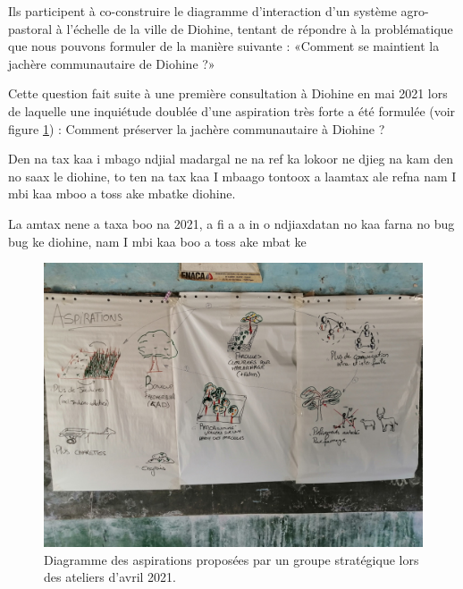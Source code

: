 \begin{paracol}{2}
  Ils participent à co-construire le diagramme d'interaction d'un système agro-pastoral à l'échelle de la ville de Diohine, tentant de répondre à la problématique que nous pouvons formuler de la manière suivante : «Comment se maintient la jachère communautaire de Diohine ?»

  Cette question fait suite à une première consultation à Diohine en mai 2021 lors de laquelle une inquiétude doublée d'une aspiration très forte a été formulée (voir figure \ref{aspiration}) : Comment préserver la jachère communautaire à Diohine ?\cite{perrotton_definition_2021}

  \switchcolumn %

  Den na tax kaa i mbago ndjial madargal ne na ref ka lokoor ne djieg na kam den no saax le diohine, to ten na tax kaa I mbaago tontoox a laamtax ale refna nam I mbi kaa mboo a toss ake mbatke diohine.

  La amtax nene a taxa boo na 2021, a fi a a in o ndjiaxdatan no kaa farna no bug bug ke diohine, nam I mbi kaa boo a toss ake mbat ke

\end{paracol}

\begin{figure}[h!]
  \begin{center}
  \includegraphics[width=15cm]{img/aspiration_formulee.jpg}
  \end{center}
  \caption{Diagramme des aspirations proposées par un groupe stratégique lors des ateliers d'avril 2021.}
  \label{aspiration}
\end{figure}

